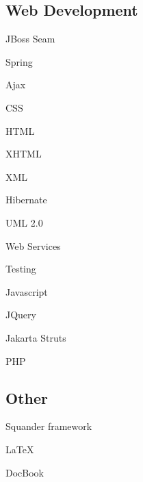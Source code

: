 \documentclass[czech]{article}
\renewenvironment{itemize}{
  \begin{list}{}{
    \setlength{\leftmargin}{1.5em}
  }
}{
  \end{list}
}
\begin{document}
\begin{multicols}{2} 
{\textcolor{coffee}{\subsection*{Web Development}}
\begin{multicols}{2}
\begin{itemize}
\item JBoss Seam
\item Spring
\item Ajax
\item CSS
\item HTML
\item XHTML
\item XML
\item Hibernate
\item UML 2.0
\item Web Services
\item Testing
\item Javascript
\item JQuery
\item Jakarta Struts
\item PHP
\end{itemize}
\end{multicols}
}
\textcolor{coffee}{\subsection*{Other}}
\begin{itemize}
\item Squander framework
\item \LaTeX
\item DocBook
 
\end{itemize}
\end{multicols}
\end{document}
